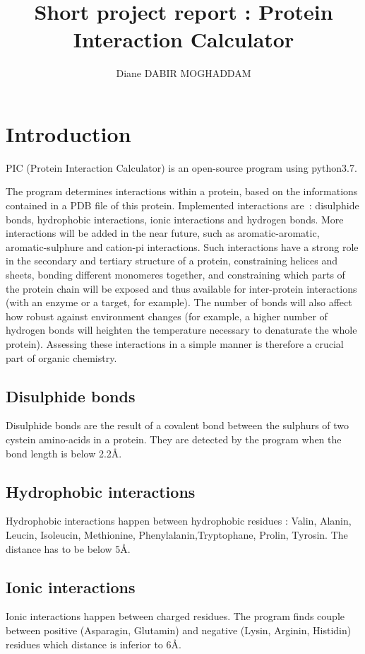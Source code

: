 \documentclass[]{article}
\title{Short project report : Protein Interaction Calculator}
\author{Diane DABIR MOGHADDAM}
\begin{document}
\maketitle


\section{Introduction}
PIC (Protein Interaction Calculator) is an open-source program using python3.7.

The program determines interactions within a protein, based on the informations contained in a PDB file of this protein.
Implemented interactions are : disulphide bonds, hydrophobic interactions, ionic interactions and hydrogen bonds.
More interactions will be added in the near future, such as aromatic-aromatic, aromatic-sulphure and cation-pi interactions.
Such interactions have a strong role in the secondary and tertiary structure of a protein, constraining helices and sheets, bonding different monomeres together, and constraining which parts of the protein chain will be exposed and thus available for inter-protein interactions (with an enzyme or a target, for example).
The number of bonds will also affect how robust against environment changes (for example, a higher number of hydrogen bonds will heighten the temperature necessary to denaturate the whole protein).
Assessing these interactions in a simple manner is therefore a crucial part of organic chemistry.

\subsection{Disulphide bonds}
Disulphide bonds are the result of a covalent bond between the sulphurs of two cystein amino-acids in a protein. They are detected by the program when the bond length is below 2.2\si{\angstrom}.

\subsection{Hydrophobic interactions}
Hydrophobic interactions happen between hydrophobic residues : Valin, Alanin, Leucin, Isoleucin, Methionine, Phenylalanin,Tryptophane, Prolin, Tyrosin.
The distance has to be below 5\si{\angstrom}. 

\subsection{Ionic interactions}
Ionic interactions happen between charged residues. The program finds couple between positive (Asparagin, Glutamin) and negative (Lysin, Arginin, Histidin) residues which distance is inferior to 6\si{\angstrom}.
\end{document}
